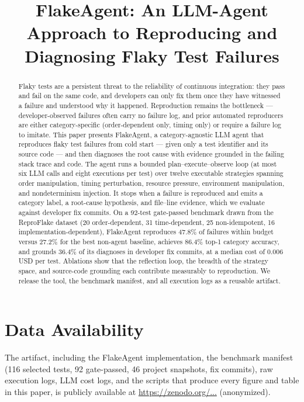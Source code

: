 \documentclass[acmsmall,review,anonymous,screen]{acmart}
\begin{document}
\title{FlakeAgent: An LLM-Agent Approach to Reproducing and Diagnosing Flaky Test Failures}

\begin{abstract}
Flaky tests are a persistent threat to the reliability of continuous integration:
they pass and fail on the same code, and developers can only fix them once they have
witnessed a failure and understood why it happened. Reproduction remains the bottleneck
— developer-observed failures often carry no failure log, and prior automated
reproducers are either category-specific (order-dependent only, timing only) or
require a failure log to imitate. This paper presents FlakeAgent, a category-agnostic
LLM agent that reproduces flaky test failures from cold start — given only a test
identifier and its source code — and then diagnoses the root cause with
evidence grounded in the failing stack trace and code. The agent runs a bounded
plan--execute--observe loop (at most six LLM calls and eight executions per test)
over twelve executable strategies spanning order manipulation, timing perturbation,
resource pressure, environment manipulation, and nondeterminism injection. It stops
when a failure is reproduced and emits a category label, a root-cause hypothesis,
and file--line evidence, which we evaluate against developer fix commits.
On a 92-test gate-passed benchmark drawn from the ReproFlake dataset
(20 order-dependent, 31 time-dependent, 25 non-idempotent, 16 implementation-dependent),
FlakeAgent reproduces 47.8\% of failures within budget versus 27.2\% for the
best non-agent baseline, achieves 86.4\% top-1 category accuracy, and grounds
36.4\% of its diagnoses in developer fix commits, at a median cost of
0.006 USD per test. Ablations show that the reflection loop, the breadth of the
strategy space, and source-code grounding each contribute measurably to reproduction.
We release the tool, the benchmark manifest, and all execution logs as a
reusable artifact.
\end{abstract}

\maketitle












\section{Data Availability}
The artifact, including the FlakeAgent implementation, the benchmark manifest
(116 selected tests, 92 gate-passed, 46 project snapshots, fix commits), raw execution logs, LLM cost logs,
and the scripts that produce every figure and table in this paper, is publicly
available at \url{https://zenodo.org/...} (anonymized).



\end{document}
